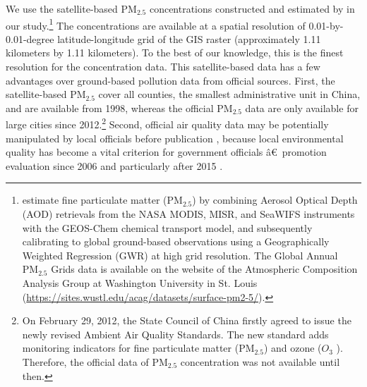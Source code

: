 \documentclass[12pt]{article}
\begin{document}
    We use the satellite-based $\mathrm{PM_{2.5}}$ concentrations constructed
    and estimated by \cite{van2021monthly} in our study.\footnote{\cite%
    {van2021monthly} estimate fine particulate matter ($\mathrm{PM_{2.5}}$) by
    combining Aerosol Optical Depth (AOD) retrievals from the NASA MODIS, MISR,
    and SeaWIFS instruments with the GEOS-Chem chemical transport model, and
    subsequently calibrating to global ground-based observations using a
    Geographically Weighted Regression (GWR) at high grid resolution. The Global
    Annual $\mathrm{PM_{2.5}}$ Grids data is available on the website of the
    Atmospheric Composition Analysis Group at Washington University in St. Louis
    (\url{https://sites.wustl.edu/acag/datasets/surface-pm2-5/}).}  The
    concentrations are available at a spatial resolution of 0.01-by-0.01-degree
    latitude-longitude grid of the GIS raster (approximately 1.11 kilometers by
    1.11 kilometers). To the best of our knowledge, this is the finest
    resolution for the concentration data. This satellite-based data has a few
    advantages over ground-based pollution data from official sources. First,
    the satellite-based $\mathrm{PM_{2.5}}$ cover all counties, the smallest
    administrative unit in China, and are available from 1998, whereas the
    official $\mathrm{PM_{2.5}}$ data are only available for large cities since
    2012.\footnote{%
    On February 29, 2012, the State Council of China firstly agreed to issue the
    newly revised Ambient Air Quality Standards. The new standard adds
    monitoring indicators for fine particulate matter ($\mathrm{PM_{2.5}}$) and
    ozone ($O_{3}$ ). Therefore, the official data of $\mathrm{PM_{2.5}}$
    concentration was not available until then.} Second, official air quality
    data may be potentially manipulated by local officials before publication %
    \citep{ghanem2014effortless,andrews2008inconsistencies}, because local
    environmental quality has become a vital criterion for government officials
    \^{a}\euro \texttrademark\ promotion evaluation since 2006 and particularly
    after 2015 \citep{fan2022unintended}.
    
\end{document}
